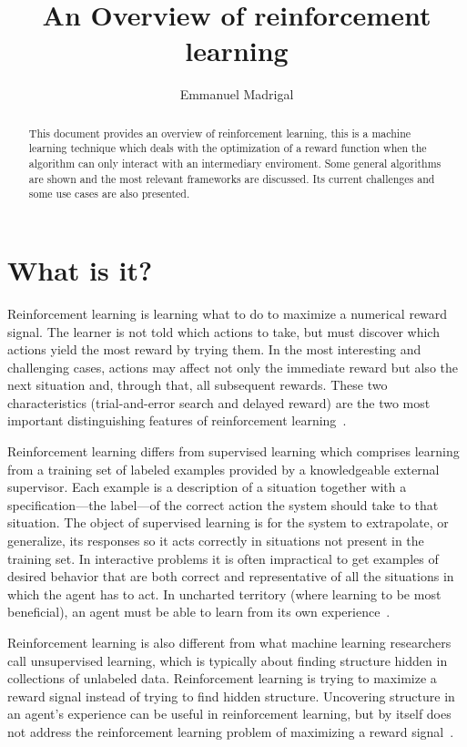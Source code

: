 \documentclass[letterpaper, 10 pt]{IEEEconf}
\title{\LARGE \bf
An Overview of reinforcement learning
}
\author{Emmanuel Madrigal%
}
\begin{document}
\maketitle{}

\begin{abstract}
  This document provides an overview of reinforcement learning, this
  is a machine learning technique which deals with the optimization of
  a reward function when the algorithm can only interact with an
  intermediary enviroment. Some general algorithms are shown and the
  most relevant frameworks are discussed. Its current challenges and
  some use cases are also presented.
\end{abstract}

\section{What is it?}

Reinforcement learning is learning what to do to maximize a numerical
reward signal. The learner is not told which actions to take, but must
discover which actions yield the most reward by trying them. In the
most interesting and challenging cases, actions may affect not only
the immediate reward but also the next situation and, through that,
all subsequent rewards. These two characteristics (trial-and-error
search and delayed reward) are the two most important distinguishing
features of reinforcement learning~\cite{sutton2018reinforcement}.

Reinforcement learning differs from supervised learning which
comprises learning from a training set of labeled examples provided by
a knowledgeable external supervisor. Each example is a description of
a situation together with a specification—the label—of the correct
action the system should take to that situation. The object of
supervised learning is for the system to extrapolate, or generalize,
its responses so it acts correctly in situations not present in the
training set. In interactive problems it is often impractical to get
examples of desired behavior that are both correct and representative
of all the situations in which the agent has to act. In uncharted
territory (where learning to be most beneficial), an agent must be
able to learn from its own experience~\cite{sutton2018reinforcement}.

Reinforcement learning is also different from what machine learning
researchers call unsupervised learning, which is typically about
finding structure hidden in collections of unlabeled
data. Reinforcement learning is trying to maximize a reward signal
instead of trying to find hidden structure. Uncovering structure in an
agent’s experience can be useful in reinforcement learning, but by
itself does not address the reinforcement learning problem of
maximizing a reward signal~\cite{sutton2018reinforcement}.
\end{document}
